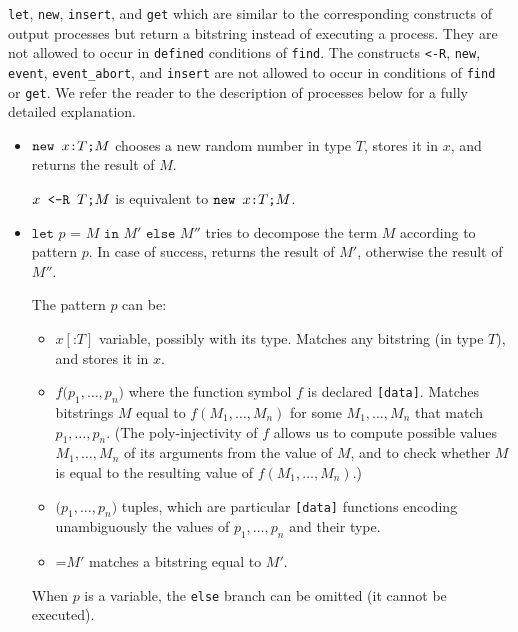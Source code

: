 \texttt{let}, \texttt{new}, \texttt{insert}, and \texttt{get} which are similar to the corresponding
constructs of output processes but return a bitstring instead of
executing a process. 
They are not allowed to occur in \texttt{defined} conditions of \texttt{find}.
The constructs \texttt{<-R}, \texttt{new}, \texttt{event}, \texttt{event\string_abort}, and \texttt{insert} are not allowed to 
occur in conditions of \texttt{find} or {\tt get}.
We refer the reader to the description of 
processes below for a fully detailed explanation.
\begin{itemize}

\item $\texttt{new\ }{x}\texttt{:}{T}\texttt{;}M$ chooses a new
random number in type $T$, stores it in $x$, and returns the result 
of $M$.

${x}\texttt{ <-R }{T}\texttt{;}M$ is equivalent to $\texttt{new\ }{x}\texttt{:}{T}\texttt{;}M$.

\item $\texttt{let }p \texttt{ = }M\texttt{ in }M'\texttt{ else }M''$
tries to decompose the term $M$ according to pattern $p$.
In case of success, returns the result of $M'$, otherwise 
the result of $M''$. 

The pattern $p$ can be:
\begin{itemize}

\item $x[\texttt{:}T]$ variable, possibly with its type. Matches any bitstring
(in type $T$), and stores it in $x$.

\item $f\texttt{(}p_1, \ldots, p_n\texttt{)}$ 
where the function symbol $f$ is declared 
\texttt{[data]}. Matches bitstrings $M$ equal to $f(M_1, \ldots, M_n)$
for some $M_1, \ldots, M_n$ that match $p_1, \ldots, p_n$.
(The poly-injectivity of $f$ allows us to compute possible
values $M_1, \ldots, M_n$ of its arguments from the value of $M$, and to check
whether $M$ is equal to the resulting value of $f(M_1, \ldots, M_n)$.) 

\item $\texttt{(}p_1, \ldots, p_n\texttt{)}$ tuples, which are particular \texttt{[data]}
functions encoding unambiguously the values of $p_1, \ldots, p_n$
and their type.

\item $\texttt{=}M'$ matches a bitstring equal to $M'$.

\end{itemize}
When $p$ is a variable, the \texttt{else}
branch can be omitted (it cannot be executed).


\end{itemize}
